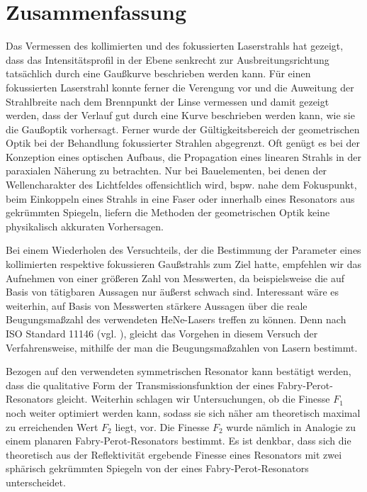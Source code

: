 \documentclass[11pt,a4paper,oneside]{scrartcl}
\begin{document}
\section{Zusammenfassung}
Das Vermessen des kollimierten und des fokussierten Laserstrahls hat gezeigt, dass das Intensitätsprofil in der Ebene senkrecht zur Ausbreitungsrichtung tatsächlich durch eine Gaußkurve beschrieben werden kann. Für einen fokussierten Laserstrahl konnte ferner die Verengung vor und die Auweitung der Strahlbreite nach dem Brennpunkt der Linse vermessen und damit gezeigt werden, dass der Verlauf gut durch eine Kurve beschrieben werden kann, wie sie die Gaußoptik vorhersagt. Ferner wurde der Gültigkeitsbereich der geometrischen Optik bei der Behandlung fokussierter Strahlen abgegrenzt. Oft genügt es bei der Konzeption eines optischen Aufbaus, die Propagation eines linearen Strahls in der paraxialen Näherung zu betrachten. Nur bei Bauelementen, bei denen der Wellencharakter des Lichtfeldes offensichtlich wird, bspw. nahe dem Fokuspunkt, beim Einkoppeln eines Strahls in eine Faser oder innerhalb eines Resonators aus gekrümmten Spiegeln, liefern die Methoden der geometrischen Optik keine physikalisch akkuraten Vorhersagen.\par
Bei einem Wiederholen des Versuchteils, der die Bestimmung der Parameter eines kollimierten respektive fokussieren Gaußstrahls zum Ziel hatte, empfehlen wir das Aufnehmen von einer größeren Zahl von Messwerten, da beispielsweise die auf Basis von  tätigbaren Aussagen nur äußerst schwach sind. Interessant wäre es weiterhin, auf Basis von Messwerten stärkere Aussagen über die reale Beugungsmaßzahl des verwendeten HeNe-Lasers treffen zu können. Denn nach ISO Standard 11146 (vgl. \cite{paschotta2008beam}), gleicht das Vorgehen in diesem Versuch der Verfahrensweise, mithilfe der man die Beugungsmaßzahlen von Lasern bestimmt.\par
Bezogen auf den verwendeten symmetrischen Resonator kann bestätigt werden, dass die qualitative Form der Transmissionsfunktion der eines Fabry-Perot-Resonators gleicht. Weiterhin schlagen wir Untersuchungen, ob die Finesse $F_1$ noch weiter optimiert werden kann, sodass sie sich näher am theoretisch maximal zu erreichenden Wert $F_2$ liegt, vor. Die Finesse $F_2$ wurde nämlich in Analogie zu einem planaren Fabry-Perot-Resonators bestimmt. Es ist denkbar, dass sich die theoretisch aus der Reflektivität ergebende Finesse eines Resonators mit zwei sphärisch gekrümmten Spiegeln von der eines Fabry-Perot-Resonators unterscheidet.
\newpage
\end{document}

